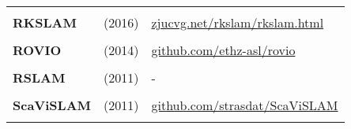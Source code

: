 \documentclass[a4paper,12pt]{scrartcl}
\begin{document}
{\begin{longtable}{l|l|l}
                           &                                                                                             &                                                                                                                              \\ [-3mm]
    \textbf{RKSLAM}        & \cite{Liu2016} (2016)                                                                       & {\href{https://zjucvg.net/rkslam/rkslam.html}{zjucvg.net/rkslam/rkslam.html}}                                                \\
                           &                                                                                             &                                                                                                                              \\ [-3mm]
    \textbf{ROVIO}         & \cite{Bloesch2015} (2014)                                                                   & {\href{https://github.com/ethz-asl/rovio}{github.com/ethz-asl/rovio}}                                                        \\
                           &                                                                                             &                                                                                                                              \\ [-3mm]
    \textbf{RSLAM}         & \cite{Mei2011} (2011)                                                                       & -                                                                                                                            \\
                           &                                                                                             &                                                                                                                              \\ [-3mm]
    \textbf{ScaViSLAM}     & \cite{Strasdat2011} (2011)                                                                  & {\href{https://github.com/strasdat/ScaViSLAM}{github.com/strasdat/ScaViSLAM}}                                                \\
                           &                                                                                             &                                                                                                                              \\ [-3mm]

\end{longtable}}
\end{document}
